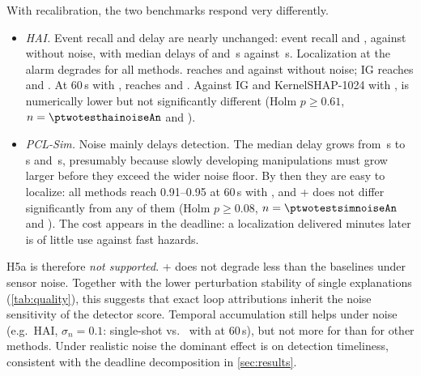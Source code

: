 \noindent With recalibration, the two benchmarks respond very differently.
\begin{itemize}
\item \emph{HAI.} Event recall and delay are nearly unchanged: event recall \ptwohainoiseAdeteventrecall{} and \ptwohainoiseBdeteventrecall, against \ptwohairefBdeteventrecall{} without noise, with median delays of \ptwohainoiseAdetdelaymedians{} and \ptwohainoiseBdetdelaymedians\,s against \ptwohairefBdetdelaymedians\,s. Localization at the alarm degrades for all methods. \LX{} reaches \ptwohainoiseALXsingleZerohrOne{} and \ptwohainoiseBLXsingleZerohrOne{} against \ptwohairefBLXsingleZerohrOne{} without noise; IG reaches \ptwohainoiseAIGsingleZerohrOne{} and \ptwohainoiseBIGsingleZerohrOne. At 60\,s with \TEA, \LX{} reaches \ptwohainoiseALXteaSixZerohrOne{} and \ptwohainoiseBLXteaSixZerohrOne. Against IG and KernelSHAP-1024 with \TEA, \LX{} is numerically lower but not significantly different (Holm $p\ge0.61$, $n=\ptwotesthainoiseAn$ and \ptwotesthainoiseBn).
\item \emph{PCL-Sim.} Noise mainly delays detection. The median delay grows from \ptwosimrefBdetdelaymedians\,s to \ptwosimnoiseAdetdelaymedians\,s and \ptwosimnoiseBdetdelaymedians\,s, presumably because slowly developing manipulations must grow larger before they exceed the wider noise floor. By then they are easy to localize: all methods reach 0.91--0.95 at 60\,s with \TEA, and \LX+\TEA{} does not differ significantly from any of them (Holm $p\ge0.08$, $n=\ptwotestsimnoiseAn$ and \ptwotestsimnoiseBn). The cost appears in the deadline: a localization delivered minutes later is of little use against fast hazards.
\end{itemize}
H5a is therefore \emph{not supported}. \LX+\TEA{} does not degrade less than the baselines under sensor noise. Together with the lower perturbation stability of single \LX{} explanations (\cref{tab:quality}), this suggests that exact loop attributions inherit the noise sensitivity of the detector score. Temporal accumulation still helps under noise (e.g.\ HAI, $\sigma_n=0.1$: \LX{} \ptwohainoiseALXsingleSixZerohrOne{} single-shot vs.\ \ptwohainoiseALXteaSixZerohrOne{} with \TEA{} at 60\,s), but not more for \LX{} than for other methods. Under realistic noise the dominant effect is on detection timeliness, consistent with the deadline decomposition in \cref{sec:results}.
